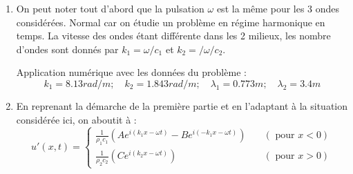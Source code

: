 \documentclass[10pt, a4paper]{article}
\newcommand{\question}[1]{}
\newcommand{\answer}[1]{#1}
\begin{document}
\begin{enumerate}
\item 
\question{
Quel est l'expression des paramètres $k_1$ et $k_2$ en fonction de la fréquence $\omega$ et des propriétés des milieux correspondants ?

Application numérique : donnez la valeur de $k_1$ et $k_2$ ainsi que les longueurs d'ondes associées $\lambda_1$, $\lambda_2$ pour une fréquence $\omega = 2 \pi f $ avec $f = 440 Hz$ (fréquence de la note de référence $la_4$ pour les instruments de musique) pour une transmission entre l'air et l'eau. 
}
\answer{
On peut noter tout d'abord que la pulsation $\omega$ est la même pour les 3 ondes considérées. Normal car on étudie un problème en régime harmonique en temps. La vitesse des ondes étant différente dans les 2 milieux, les nombre d'ondes sont donnés par 
$k_1 = \omega/c_1$ et $k_2=/\omega / c_2$.

Application numérique avec les données du problème :
$$
k_1 = 8.13 rad/m; \quad k_2 = 1.843 rad/m; \quad \lambda_1 = 0.773 m ; \quad \lambda_2 = 3.4 m$$
}






\item
\question{
A partir des équations du mouvement, donnez l'expression du champ de vitesse $u'(x,t)$ (respectivement pour $x<0$ et pour $x>0$) .
}
\answer{
En reprenant la démarche de la première partie et en l'adaptant à la situation considérée ici, on aboutit à :
\begin{equation}
u'(x,t) = \left\{ \begin{array}{ll} 
\frac{1}{\rho_1 c_1} \left( A e^{i (k_1 x - \omega t)} - B e^{i (-k_1 x - \omega t)} \right)& \quad ( \mbox{ pour }  x<0) \\
\frac{1}{\rho_2 c_2} \left( C e^{i (k_2 x - \omega t)} \right) & \quad ( \mbox{ pour }  x>0) 
\end{array}
\right.
\label{eq:ABCu}
\end{equation}
}


\end{enumerate}
\end{document}
